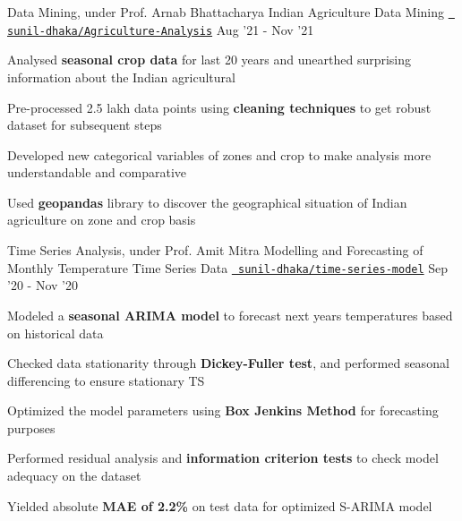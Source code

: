 \begin{cventries}
  \cventry
  {Data Mining, under Prof. Arnab Bhattacharya}
  {Indian Agriculture Data Mining}
  {\texttt{\href{https://github.com/sunil-dhaka/Agriculture-Analysis-on-Indian-States}{\faGithub{} sunil-dhaka/Agriculture-Analysis}}}
  {Aug '21 - Nov '21}
  {
    \begin{cvitems}
    \item Analysed \textbf{seasonal crop data} for last 20 years and unearthed surprising information about the Indian agricultural
    \item Pre-processed 2.5 lakh data points using \textbf{cleaning techniques} to get robust dataset for subsequent steps
    \item Developed new categorical variables of zones and crop to make analysis more understandable and comparative
    \item Used \textbf{geopandas} library to discover the geographical situation of Indian agriculture on zone and crop basis
    \end{cvitems}
  }
  

  \cventry
  {Time Series Analysis, under Prof. Amit Mitra}
  {Modelling and Forecasting of Monthly Temperature Time Series Data}
  {\texttt{\href{https://github.com/sunil-dhaka/time-series-model}{\faGithub{} sunil-dhaka/time-series-model}}}
  {Sep '20 - Nov '20}
  {
    \begin{cvitems}
      \item Modeled a \textbf{seasonal ARIMA model} to forecast next years temperatures based on historical data 
      \item Checked data stationarity through \textbf{Dickey-Fuller test}, and performed seasonal differencing to ensure stationary TS
      \item Optimized the model parameters using \textbf{Box Jenkins Method} for forecasting purposes
      \item Performed residual analysis and \textbf{information criterion tests} to check model adequacy on the dataset
      \item Yielded absolute \textbf{MAE of 2.2\%} on test data for optimized S-ARIMA model  
    \end{cvitems}
  }


\end{cventries}
